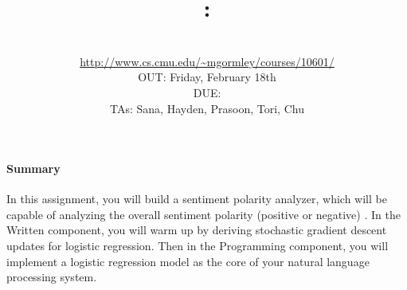 \documentclass[11pt,addpoints,answers]{exam}
\title{\textsc{\hwNum}: \textsc{\hwTopic}
} %
\author{\courseName\\
\url{http://www.cs.cmu.edu/~mgormley/courses/10601/} \\
OUT: Friday, February 18th \\
DUE: \dueDate{} \\
TAs: Sana, Hayden, Prasoon, Tori, Chu
}
\date{}
\date{}
\begin{document}
\maketitle



\begin{notebox}
\paragraph{Summary} In this assignment, you will build a sentiment polarity analyzer, which will be capable of analyzing the overall sentiment polarity (positive or negative) . In the Written component, you will warm up by deriving stochastic gradient descent updates for logistic regression. Then in the Programming component, you will implement a logistic regression model as the core of your natural language processing system.
\end{notebox}
\newcommand \maxsubs {10 }
\end{document}

